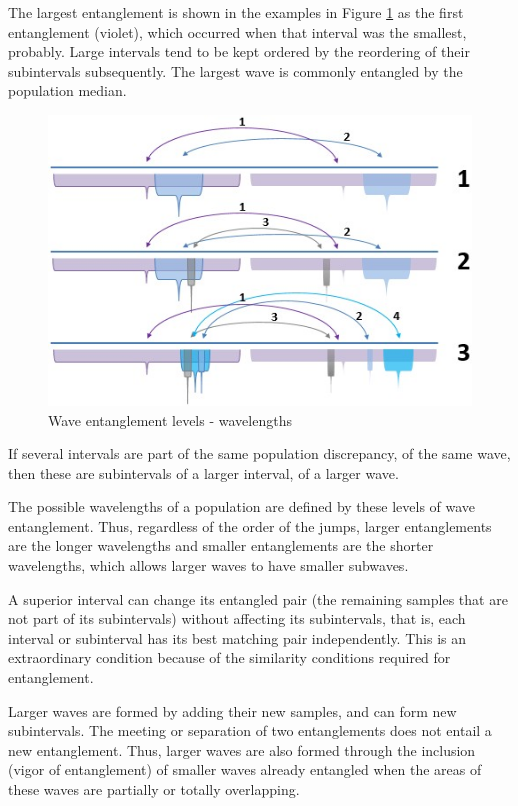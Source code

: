 The largest entanglement is shown in the examples in Figure \ref{fig:consciousness_subconscious_entanglement} as the first entanglement (violet), which occurred when that interval was the smallest, probably.  Large intervals tend to be kept ordered by the reordering of their subintervals subsequently. The largest wave is commonly entangled by the population median.
	\begin{figure}[H]
	\caption{Wave entanglement levels - wavelengths}
	\label{fig:consciousness_subconscious_entanglement}
	\centering
	\includegraphics[scale=.8]{sections/images/consciousness_subconscious_entanglement.jpg}
	\end{figure}

If several intervals are part of the same population discrepancy, of the same wave, then these are subintervals of a larger interval, of a larger wave.

The possible wavelengths of a population are defined by these levels of wave entanglement. Thus, regardless of the order of the jumps, larger entanglements are the longer wavelengths and smaller entanglements are the shorter wavelengths, which allows larger waves to have smaller subwaves. 

A superior interval can change its entangled pair (the remaining samples that are not part of its subintervals) without affecting its subintervals, that is, each interval or subinterval has its best matching pair independently. This is an extraordinary condition because of the similarity conditions required for entanglement.

Larger waves are formed by adding their new samples, and can form new subintervals. The meeting or separation of two entanglements does not entail a new entanglement. Thus, larger waves are also formed through the inclusion (vigor of entanglement) of smaller waves already entangled when the areas of these waves are partially or totally overlapping.

